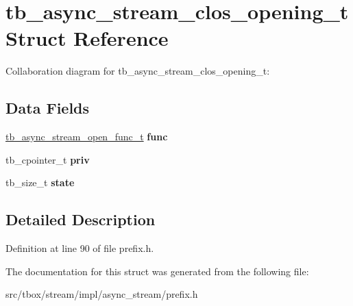 \hypertarget{structtb__async__stream__clos__opening__t}{\section{tb\-\_\-async\-\_\-stream\-\_\-clos\-\_\-opening\-\_\-t Struct Reference}
\label{structtb__async__stream__clos__opening__t}
}


Collaboration diagram for tb\-\_\-async\-\_\-stream\-\_\-clos\-\_\-opening\-\_\-t\-:
\subsection*{Data Fields}
\begin{DoxyCompactItemize}
\item 
\hypertarget{structtb__async__stream__clos__opening__t_acaff7ac3ba8fa124447a6c1ac74bf1dc}{\hyperlink{async__stream_8h_a04a858fc06433335236db4bddcdfc1cb}{tb\-\_\-async\-\_\-stream\-\_\-open\-\_\-func\-\_\-t} {\bfseries func}}\label{structtb__async__stream__clos__opening__t_acaff7ac3ba8fa124447a6c1ac74bf1dc}

\item 
\hypertarget{structtb__async__stream__clos__opening__t_a76a35598b61437ad008009b3d65b939b}{tb\-\_\-cpointer\-\_\-t {\bfseries priv}}\label{structtb__async__stream__clos__opening__t_a76a35598b61437ad008009b3d65b939b}

\item 
\hypertarget{structtb__async__stream__clos__opening__t_a95818f665c361d3e37fde99f96495e28}{tb\-\_\-size\-\_\-t {\bfseries state}}\label{structtb__async__stream__clos__opening__t_a95818f665c361d3e37fde99f96495e28}

\end{DoxyCompactItemize}


\subsection{Detailed Description}


Definition at line 90 of file prefix.\-h.



The documentation for this struct was generated from the following file\-:\begin{DoxyCompactItemize}
\item 
src/tbox/stream/impl/async\-\_\-stream/prefix.\-h\end{DoxyCompactItemize}
